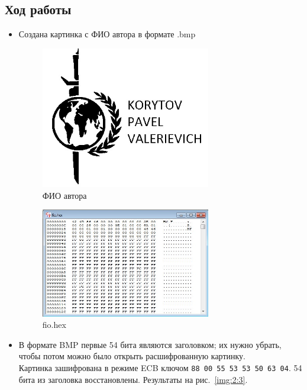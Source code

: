 \documentclass[a4paper, 14pt]{extarticle}
\begin{document}
\subsection{Ход работы}
\begin{itemize}
    \item Создана картинка с ФИО автора в формате .bmp %
    \begin{figure}[h]
        \centering
        \includegraphics[width=0.7\textwidth]{./img/fio.jpg}
        \caption{ФИО автора}%
        \label{img:2:1}
    \end{figure}
    \begin{figure}[h]
        \centering
        \includegraphics[width=0.7\textwidth]{./img/S009.jpg}
        \caption{fio.hex}%
        \label{img:2:2}
    \end{figure}
    \FloatBarrier{}
    \item В формате BMP первые 54 бита являются заголовком; их нужно убрать, чтобы потом можно было открыть расшифрованную картинку.\\
    Картинка зашифрована в режиме ECB ключом \texttt{88 00 55 53 53 50 63 04}. 54 бита из заголовка восстановлены. Результаты на рис.~\ref{img:2:3}.
    \begin{figure}[h]

\end{figure}
\end{itemize}
\end{document}
